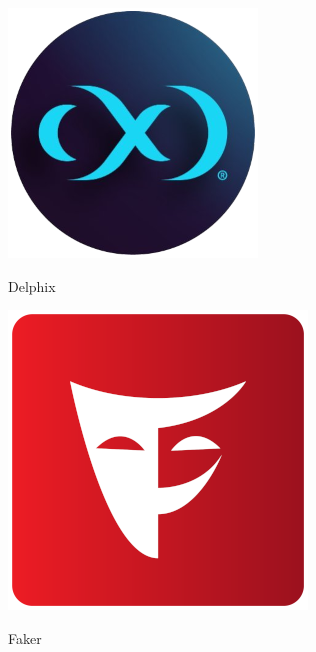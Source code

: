 \documentclass[
    aspectratio=169,
]{beamer}
\begin{document}
\begin{frame}[fragile]
\begin{minipage}[c]{0.35\textwidth}
\begin{minipage}[t]{0.48\textwidth}
            \includegraphics[width=0.7\linewidth, frame]{image/delphix}\par
            Delphix
        \end{minipage}%
        
        \pause
        
        \vspace{10pt}
        
        \includegraphics[width=0.7\linewidth, frame]{image/faker}\par
        Faker
        
    \end{minipage}%
    \hspace*{\fill}%
\end{frame}
\end{document}
